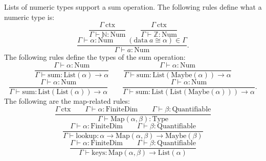 \documentclass[11pt]{article}
\begin{document}
Lists of numeric types support a sum operation. The following
rules define what a numeric type is:
\begin{equation}
	\frac{\Gamma\ \text{ctx}}
	{\Gamma \vdash \mathbb{N} : \text{Num}}
	\qquad
	\frac{\Gamma\ \text{ctx}}
	{\Gamma \vdash \mathbb{Z} : \text{Num}}
\end{equation}
\begin{equation}
	\frac{\Gamma \vdash \alpha : \text{Num}
	\qquad (\text{data}\ a \cong \alpha) \in \Gamma}
	{\Gamma \vdash a : \text{Num}}.
\end{equation}
The following rules define the types of the sum operation:
\begin{equation}
	\frac{\Gamma \vdash \alpha : \text{Num}}
	{\Gamma \vdash \text{sum} : \text{List}(\alpha) \to \alpha}
	\qquad
	\frac{\Gamma \vdash \alpha : \text{Num}}
	{\Gamma \vdash \text{sum} : \text{List}(\text{Maybe}(\alpha)) \to \alpha}
\end{equation}
\begin{equation}
	\frac{\Gamma \vdash \alpha : \text{Num}}
	{\Gamma \vdash \text{sum} : \text{List}(\text{List}(\alpha)) \to \alpha}
	\qquad
	\frac{\Gamma \vdash \alpha : \text{Num}}
	{\Gamma \vdash \text{sum} : \text{List}(\text{List}(\text{Maybe}(\alpha))) \to \alpha}.
\end{equation}
The following are the map-related rules:
\begin{equation}
	\frac{\Gamma\ \text{ctx}
	\qquad \Gamma \vdash \alpha : \text{FiniteDim}
	\qquad \Gamma \vdash \beta : \text{Quantifiable}}
	{\Gamma \vdash \text{Map}(\alpha, \beta) : \text{Type}}
\end{equation}
\begin{equation}
	\frac{\Gamma \vdash \alpha : \text{FiniteDim}
	\qquad \Gamma \vdash \beta : \text{Quantifiable}}
	{\Gamma \vdash \text{lookup} : \alpha \to \text{Map}(\alpha, \beta) \to \text{Maybe}(\beta)}
\end{equation}
\begin{equation}
	\frac{\Gamma \vdash \alpha : \text{FiniteDim}
	\qquad \Gamma \vdash \beta : \text{Quantifiable}}
	{\Gamma \vdash \text{keys} : \text{Map}(\alpha, \beta) \to \text{List}(\alpha)}
\end{equation}
\end{document}
